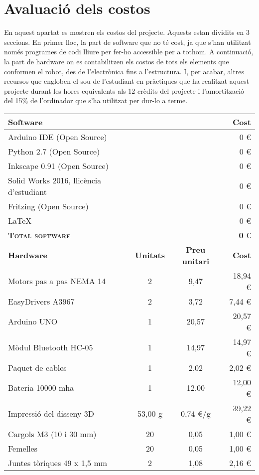\section{Avaluació dels costos}
En aquest apartat es mostren els costos del projecte. Aquests estan dividits en 3 seccions. En primer lloc, la part de software que no té cost, ja que s'han utilitzat només programes de codi lliure per fer-ho accessible per a tothom. A continuació, la part de hardware on es contabilitzen els costos de tots els elements que conformen el robot, des de l'electrònica fins a l'estructura. I, per acabar, altres recursos que engloben el sou de l'estudiant en pràctiques que ha realitzat aquest projecte durant les hores equivalents als 12 crèdits del projecte i l'amortització del 15\% de l'ordinador que s'ha utilitzat per dur-lo a terme. 
\begin{longtable}{@{\extracolsep{\fill}} lccr}
	\toprule
	\textbf{Software}    & &  & \textbf{Cost} \\
	\midrule
	Arduino IDE (Open Source) & & &  0 \euro \\
	Python 2.7 (Open Source)& & & 0 \euro \\
	Inkscape 0.91 (Open Source)& & & 0 \euro \\
	Solid Works 2016, llicència d'estudiant & & & 0 \euro \\
	Fritzing (Open Source) & & & 0 \euro \\
	\LaTeX & & & 0 \euro \\	
	\midrule
	\textsc{\textbf{Total software}}  & & & \textbf{0} \euro\\
	\toprule
	\textbf{Hardware} & \textbf{Unitats} & \textbf{Preu unitari} & \textbf{Cost} \\
	\midrule
	Motors pas a pas NEMA 14 & 2 & 9,47 & 18,94 \euro \\
	EasyDrivers A3967 & 2 & 3,72 & 7,44 \euro \\
	Arduino UNO & 1 & 20,57 & 20,57 \euro \\
	Mòdul Bluetooth HC-05 & 1 & 14,97 &  14,97 \euro \\
	Paquet de cables & 1 & 2,02 & 2,02 \euro \\
	Bateria 10000 mha & 1 & 12,00 & 12,00 \euro \\
	Impressió del disseny 3D & 53,00 g & 0,74 \euro/g & 39,22 \euro \\
	Cargols M3 (10 i 30 mm) & 20 & 0,05 & 1,00 \euro \\
	Femelles  & 20 & 0,05 & 1,00 \euro \\
	Juntes tòriques 49 x 1,5 mm & 2 & 1,08 & 2,16 \euro \\ 	

\end{longtable}
